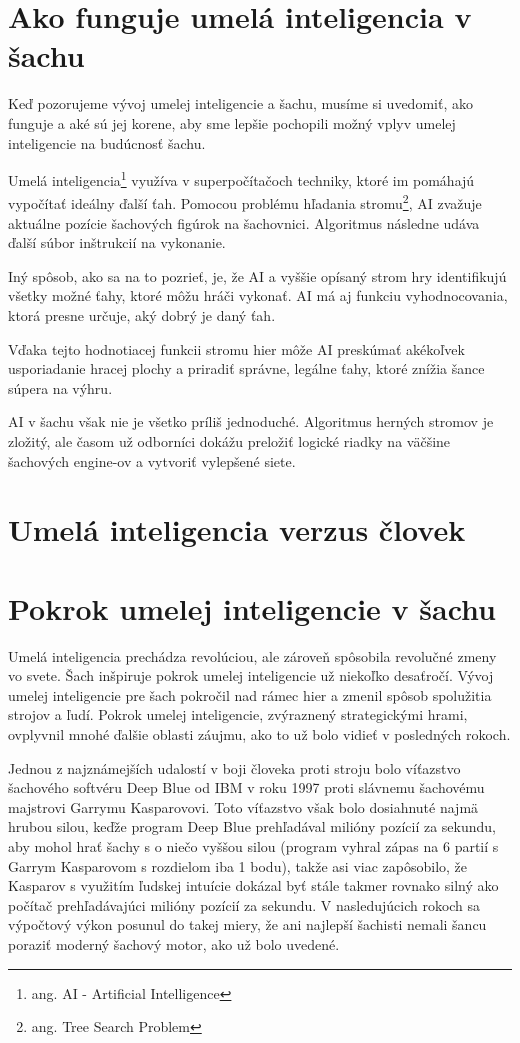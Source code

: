 \documentclass[10pt,oneside,slovak,a4paper]{article}
\begin{document}
\section{Ako funguje umelá inteligencia v šachu}

Keď pozorujeme vývoj umelej inteligencie a šachu, musíme si uvedomiť, ako funguje a aké sú jej korene, aby sme lepšie pochopili možný vplyv umelej inteligencie na budúcnosť šachu.

Umelá inteligencia\footnote{ang. AI - Artificial Intelligence} využíva v superpočítačoch techniky, ktoré im pomáhajú vypočítať ideálny ďalší ťah. Pomocou problému hľadania stromu\footnote{ang. Tree Search Problem}, AI zvažuje aktuálne pozície šachových figúrok na šachovnici. Algoritmus následne udáva ďalší súbor inštrukcií na vykonanie.

Iný spôsob, ako sa na to pozrieť, je, že AI a vyššie opísaný strom hry identifikujú všetky možné ťahy, ktoré môžu hráči vykonať. AI má aj funkciu vyhodnocovania, ktorá presne určuje, aký dobrý je daný ťah.

Vďaka tejto hodnotiacej funkcii stromu hier môže AI preskúmať akékoľvek usporiadanie hracej plochy a priradiť správne, legálne ťahy, ktoré znížia šance súpera na výhru.

AI v šachu však nie je všetko príliš jednoduché. Algoritmus herných stromov je zložitý, ale časom už odborníci dokážu preložiť logické riadky na väčšine šachových engine-ov a vytvoriť vylepšené siete.

\section{Umelá inteligencia verzus človek}

\section{Pokrok umelej inteligencie v šachu}

Umelá inteligencia prechádza revolúciou, ale zároveň spôsobila revolučné zmeny vo svete. Šach inšpiruje pokrok umelej inteligencie už niekoľko desaťročí. Vývoj umelej inteligencie pre šach pokročil nad rámec hier a zmenil spôsob spolužitia strojov a ľudí. Pokrok umelej inteligencie, zvýraznený strategickými hrami, ovplyvnil mnohé ďalšie oblasti záujmu, ako to už bolo vidieť v posledných rokoch.

Jednou z najznámejších udalostí v boji človeka proti stroju bolo víťazstvo šachového softvéru Deep Blue od IBM v roku 1997 proti slávnemu šachovému majstrovi Garrymu Kasparovovi. Toto víťazstvo však bolo dosiahnuté najmä hrubou silou, keďže program Deep Blue prehľadával milióny pozícií za sekundu, aby mohol hrať šachy s o niečo vyššou silou (program vyhral zápas na 6 partií s Garrym Kasparovom s rozdielom iba 1 bodu), takže asi viac zapôsobilo, že Kasparov s využitím ľudskej intuície dokázal byť stále takmer rovnako silný ako počítač prehľadávajúci milióny pozícií za sekundu. V nasledujúcich rokoch sa výpočtový výkon posunul do takej miery, že ani najlepší šachisti nemali šancu poraziť moderný šachový motor, ako už bolo uvedené.
\end{document}
